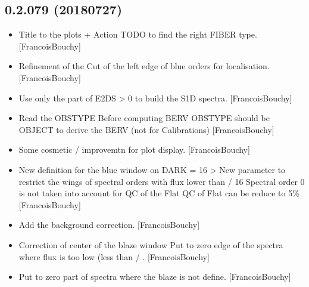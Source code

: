 \documentclass[a4paper,10pt,english]{report}
\begin{document}
\subsection{0.2.079 (2018\sphinxhyphen{}07\sphinxhyphen{}27)}
\label{\detokenize{misc/changelog:id403}}\begin{itemize}
\item {} 
Title to the plots + Action TODO to find the right FIBER type.
{[}FrancoisBouchy{]}

\item {} 
Refinement of the Cut of the left edge of blue orders for
localisation. {[}FrancoisBouchy{]}

\item {} 
Use only the part of E2DS \textgreater{} 0 to build the S1D spectra.
{[}FrancoisBouchy{]}

\item {} 
Read the OBSTYPE Before computing BERV OBSTYPE should be OBJECT to
derive the BERV (not for Calibrations) {[}FrancoisBouchy{]}

\item {} 
Some cosmetic / improvemtn for plot display. {[}FrancoisBouchy{]}

\item {} 
New definition for the blue window on DARK  = 16 \textendash{}\textgreater{}
New parameter to restrict the wings of spectral orders with flux lower
than  / 16 Spectral order 0 is not taken into account for
QC of the Flat QC of Flat can be reduce to 5\% {[}FrancoisBouchy{]}

\item {} 
Add the background correction. {[}FrancoisBouchy{]}

\item {} 
Correction of center of the blaze window Put to zero edge of the
spectra where flux is too low (less than  /
. {[}FrancoisBouchy{]}

\item {} 
Put to zero part of spectra where the blaze is not define.
{[}FrancoisBouchy{]}

\end{itemize}
\end{document}
